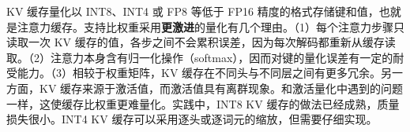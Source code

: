 \begin{interview}
KV 缓存量化以 INT8、INT4 或 FP8 等低于 FP16 精度的格式存储键和值，也就是注意力缓存。支持比权重采用\textbf{更激进}的量化有几个理由。（1）每个注意力步骤只读取一次 KV 缓存的值，各步之间不会累积误差，因为每次解码都重新从缓存读取。（2）注意力本身含有归一化操作（softmax），因而对键的量化误差有一定的耐受能力。（3）相较于权重矩阵，KV 缓存在不同头与不同层之间有更多冗余。另一方面，KV 缓存来源于激活值，而激活值具有离群现象。和激活量化中遇到的问题一样，这使缓存比权重更难量化。实践中，INT8 KV 缓存的做法已经成熟，质量损失很小。INT4 KV 缓存可以采用逐头或逐词元的缩放，但需要仔细实现。
\end{interview}
